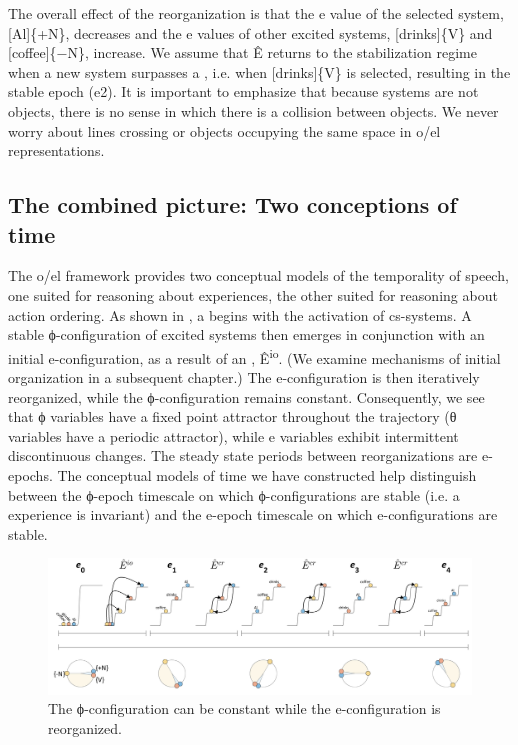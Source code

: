   The overall effect of the reorganization is that the e value of the selected system, [Al]\{+N\}, decreases and the e values of other excited systems, [drinks]\{V\} and [coffee]\{−N\}, increase. We assume that Ê returns to the stabilization regime when a new system surpasses a , i.e. when [drinks]\{V\} is selected, resulting in the stable epoch (e2). It is important to emphasize that because systems are not objects, there is no sense in which there is a collision between objects. We never worry about lines crossing or objects occupying the same space in o/el representations.

\subsection{The combined picture: Two conceptions of time}

The o/el framework provides two conceptual models of the temporality of speech, one suited for reasoning about  experiences, the other suited for reasoning about action ordering. As shown in {}, a  begins with the activation of cs-systems. A stable ϕ-configuration of excited systems then emerges in conjunction with an initial e-configuration, as a result of an , Ê\textsuperscript{io}. (We examine mechanisms of initial organization in a subsequent chapter.) The e-configuration is then iteratively reorganized, while the ϕ-configuration remains constant. Consequently, we see that ϕ variables have a fixed point attractor throughout the trajectory (θ variables have a periodic attractor), while e variables exhibit intermittent discontinuous changes. The steady state periods between reorganizations are e-epochs. The conceptual models of time we have constructed help distinguish between the ϕ-epoch timescale on which ϕ-configurations are stable (i.e. a  experience is invariant) and the e-epoch timescale on which e-configurations are stable.

  
\begin{figure}
\includegraphics[width=\textwidth]{figures/Tilsen-img27.png}
\caption{The ϕ-configuration can be constant while the e-configuration is reorganized.}
\label{fig:2:20}
\end{figure}
 

